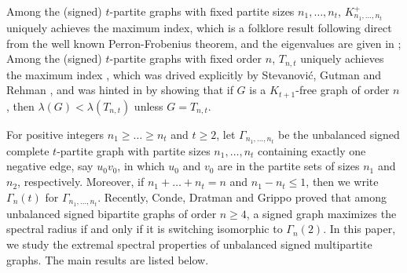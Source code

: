 \documentclass[10pt,a4paper]{amsart}
\numberwithin{equation}{section}
\begin{document}
Among the (signed) $t$-partite graphs with fixed partite sizes $n_1,\dots, n_t$, $K_{n_1, \dots, n_t}^+$ uniquely achieves the maximum index, which is a folklore result following direct from the well known Perron-Frobenius theorem, and the eigenvalues are given in \cite{De, EH}; Among the (signed) $t$-partite graphs with fixed order $n$, $T_{n,t}$ uniquely achieves the maximum index , which was drived explicitly  by Stevanovi\'c,   Gutman and Rehman \cite{SGR}, and was hinted in \cite{Ni} by showing that  if $G$ is a $K_{t+1}$-free graph of order $n$, then $\lambda(G)<\lambda(T_{n,t})$ unless $G=T_{n,t}$.



For positive integers $n_1\ge \dots \ge n_t$ and $t\ge 2$, let $\Gamma_{n_1, \dots, n_t}$  be the unbalanced signed complete  $t$-partite graph with partite sizes $n_1, \dots, n_t$  containing exactly one negative edge, say $u_0v_0$, in which $u_0$ and $v_0$ are in the partite sets of sizes $n_1$ and $n_2$, respectively. Moreover, if   $n_1+\dots+n_t=n$ and $n_1-n_t\le1$, then we write $\Gamma_n(t)$ for
 $\Gamma_{n_1, \dots, n_t}$. 
Recently, Conde, Dratman and Grippo \cite{CDG} proved that among
 unbalanced signed bipartite graphs of order $n \ge 4$, a signed graph maximizes the spectral radius if and only if it is switching isomorphic to $\Gamma_n(2)$.  In this paper, we study the extremal spectral properties of unbalanced signed multipartite graphs. The main results are listed below. 

%






\end{document}
